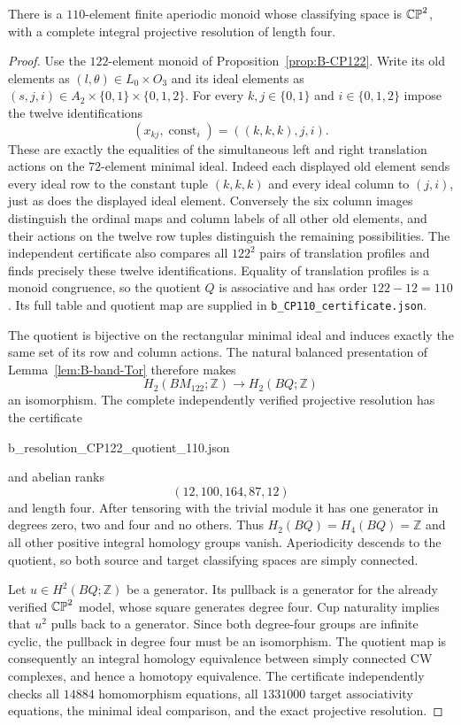 \begin{proposition}\label{prop:B-CP110}
There is a $110$-element finite aperiodic monoid whose classifying
space is $\mathbb {CP}^2$, with a complete integral projective resolution
of length four.
\end{proposition}
\begin{proof}
Use the $122$-element monoid of Proposition~\ref{prop:B-CP122}.
Write its old elements as $(l,\theta)\in L_0\times O_3$ and
its ideal elements as $(s,j,i)\in A_2\times\{0,1\}\times\{0,1,2\}$.
For every $k,j\in\{0,1\}$ and $i\in\{0,1,2\}$ impose the
twelve identifications
\[
 (x_{kj},\operatorname{const}_i)
       =((k,k,k),j,i).
\]
These are exactly the equalities of the simultaneous left and right
translation actions on the $72$-element minimal ideal.  Indeed each
displayed old element sends every ideal row to the constant tuple
$(k,k,k)$ and every ideal column to $(j,i)$, just as does the
displayed ideal element.  Conversely the six column images distinguish
the ordinal maps and column labels of all other old elements, and
their actions on the twelve row tuples distinguish the remaining
possibilities.  The independent certificate also compares all $122^2$
pairs of translation profiles and finds precisely these twelve
identifications.  Equality of translation profiles is a monoid
congruence, so the quotient $Q$ is associative and has order
$122-12=110$.  Its full table and quotient map are supplied in
\texttt{b\_CP110\_certificate.json}.

The quotient is bijective on the rectangular minimal ideal and induces
exactly the same set of its row and column actions.  The natural
balanced presentation of Lemma~\ref{lem:B-band-Tor} therefore makes
\[
 H_2(BM_{122};\mathbb Z)\longrightarrow H_2(BQ;\mathbb Z)
\]
an isomorphism.  The complete independently verified projective
resolution has the certificate
\begin{center}\small\ttfamily b\_resolution\_CP122\_quotient\_110.json\end{center}
and abelian ranks
\[
 (12,100,164,87,12)
\]
and length four.  After tensoring with the trivial module it has
one generator in degrees zero, two and four and no others.
Thus $H_2(BQ)=H_4(BQ)=\mathbb Z$ and all other positive integral
homology groups vanish.  Aperiodicity descends to the quotient, so
both source and target classifying spaces are simply connected.

Let $u\in H^2(BQ;\mathbb Z)$ be a generator.  Its pullback is
a generator for the already verified $\mathbb {CP}^2$ model, whose square
generates degree four.  Cup naturality implies that $u^2$ pulls back
to a generator.  Since both degree-four groups are infinite cyclic,
the pullback in degree four must be an isomorphism.  The quotient map
is consequently an integral homology equivalence between simply
connected CW complexes, and hence a homotopy equivalence.
The certificate independently checks all $14884$ homomorphism
equations, all $1331000$ target associativity equations, the minimal
ideal comparison, and the exact projective resolution.
\end{proof}

